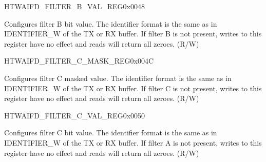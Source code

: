 \begin{register}{H}{TWAIFD\_FILTER\_B\_VAL\_REG}{0x0048}\label{regdesc:TWAIFDFILTERBVALREG}
%
%
\regnewline%
\begin{regdesc}\begin{reglist}
\label{fielddesc:TWAIFDBITVALBVAL}\item [TWAIFD\_BIT\_VAL\_B\_VAL] Configures filter B bit value. The identifier format is the same as in IDENTIFIER\_W of the TX or RX buffer. If filter B is not present, writes to this register have no effect and reads will return all zeroes. (R/W)
\end{reglist}\end{regdesc}
\end{register}


\begin{register}{H}{TWAIFD\_FILTER\_C\_MASK\_REG}{0x004C}\label{regdesc:TWAIFDFILTERCMASKREG}
%
%
\regnewline%
\begin{regdesc}\begin{reglist}
\label{fielddesc:TWAIFDBITMASKCVAL}\item [TWAIFD\_BIT\_MASK\_C\_VAL] Configures filter C masked value. The identifier format is the same as in IDENTIFIER\_W of the TX or RX buffer. If filter C is not present, writes to this register have no effect and reads will return all zeroes. (R/W)
\end{reglist}\end{regdesc}
\end{register}


\begin{register}{H}{TWAIFD\_FILTER\_C\_VAL\_REG}{0x0050}\label{regdesc:TWAIFDFILTERCVALREG}
%
%
\regnewline%
\begin{regdesc}\begin{reglist}
\label{fielddesc:TWAIFDBITVALCVAL}\item [TWAIFD\_BIT\_VAL\_C\_VAL] Configures filter C bit value. The identifier format is the same as in IDENTIFIER\_W of the TX or RX buffer. If filter A is not present, writes to this register have no effect and reads will return all zeroes. (R/W)
\end{reglist}\end{regdesc}
\end{register}


